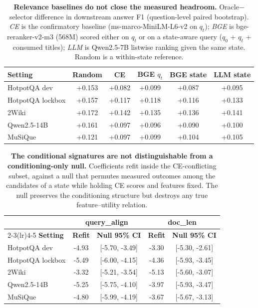 \begin{table}[t]
\centering
\small
\caption{\textbf{Relevance baselines do not close the measured headroom.}
Oracle$-$selector difference in downstream answer F1 (question-level
paired bootstrap). \emph{CE} is the confirmatory baseline
(ms-marco-MiniLM-L6-v2 on $q_t$); \emph{BGE} is bge-reranker-v2-m3
(568M) scored either on $q_t$ or on a state-aware query
($q_0$ + $q_t$ + consumed titles); \emph{LLM} is Qwen2.5-7B listwise
ranking given the same state. Random is a within-state reference.}
\label{tab:relbaselines}
\begin{tabular}{lccccc}
\toprule
\textbf{Setting} & \textbf{Random} & \textbf{CE} & \textbf{BGE $q_t$} & \textbf{BGE state} & \textbf{LLM state} \\
\midrule
HotpotQA dev & +0.153 & +0.082 & +0.099 & +0.087 & +0.095 \\
HotpotQA lockbox & +0.157 & +0.117 & +0.118 & +0.116 & +0.133 \\
2Wiki & +0.172 & +0.142 & +0.135 & +0.136 & +0.141 \\
Qwen2.5-14B & +0.161 & +0.097 & +0.096 & +0.090 & +0.100 \\
MuSiQue & +0.121 & +0.097 & +0.099 & +0.104 & +0.105 \\
\bottomrule
\end{tabular}
\end{table}

\begin{table}[t]
\centering
\small
\caption{\textbf{The conditional signatures are not distinguishable from
a conditioning-only null.} Coefficients refit inside the CE-conflicting
subset, against a null that permutes measured outcomes among the
candidates of a state while holding CE scores and features fixed. The
null preserves the conditioning structure but destroys any true
feature--utility relation.}
\label{tab:nullshuffle}
\begin{tabular}{lcccc}
\toprule
& \multicolumn{2}{c}{\textbf{query\_align}} & \multicolumn{2}{c}{\textbf{doc\_len}} \\
\cmidrule(lr){2-3}\cmidrule(lr){4-5}
\textbf{Setting} & \textbf{Refit} & \textbf{Null 95\% CI} & \textbf{Refit} & \textbf{Null 95\% CI} \\
\midrule
HotpotQA dev & -4.93 & [-5.70, -3.49] & -3.30 & [-5.30, -2.61] \\
HotpotQA lockbox & -5.49 & [-6.00, -4.15] & -4.36 & [-5.93, -3.45] \\
2Wiki & -3.32 & [-5.21, -3.54] & -5.13 & [-5.60, -3.07] \\
Qwen2.5-14B & -5.25 & [-5.75, -4.10] & -3.97 & [-5.93, -3.47] \\
MuSiQue & -4.80 & [-5.99, -4.19] & -3.67 & [-5.67, -3.13] \\
\bottomrule
\end{tabular}
\end{table}

